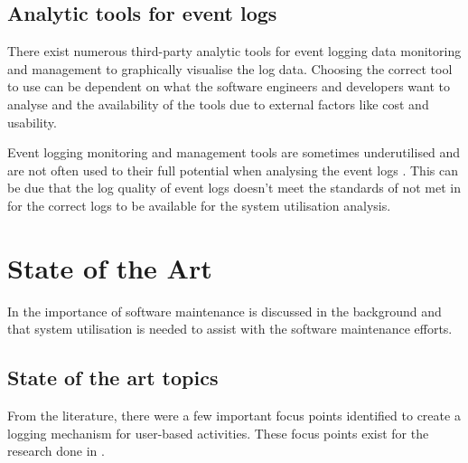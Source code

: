 \subsection{Analytic tools for event logs}
There exist numerous third-party analytic tools for event logging data monitoring and management to graphically visualise the log data. Choosing the correct tool to use can be dependent on what the software engineers and developers want to analyse and the availability of the tools due to external factors like cost and usability. \par Event logging monitoring and management tools are sometimes underutilised and are not often used to their full potential when analysing the event logs \cite{Fedaghi2010}. This can be due that the log quality of event logs doesn't meet the standards of  not met in  for the correct logs to be available for the system utilisation analysis.  

\clearpage

\section{State of the Art}
In  the importance of software maintenance is discussed in the background and that system utilisation is needed to assist with the software maintenance efforts.

\subsection{State of the art topics}
From the literature, there were a few important focus points identified to create a logging mechanism for user-based activities. These focus points exist for the research done in .


